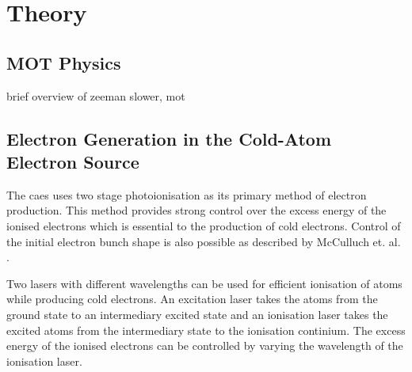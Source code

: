 \chapter{Theory}

\section{MOT Physics}

brief overview of zeeman slower, mot

\section{Electron Generation in the Cold-Atom Electron Source}
The \gls{caes} uses two stage photoionisation as its primary method of electron production. This method provides strong control over the excess energy of the ionised electrons which is essential to the production of cold electrons. Control of the initial electron bunch shape is also possible as described by McCulluch et. al. \cite{mcculloch_arbitrarily_2011}.

Two lasers with different wavelengths can be used for efficient ionisation of atoms while producing cold electrons. An excitation laser takes the atoms from the ground state to an intermediary excited state and an ionisation laser takes the excited atoms from the intermediary state to the ionisation continium. The excess energy of the ionised electrons can be controlled by varying the wavelength of the ionisation laser.

